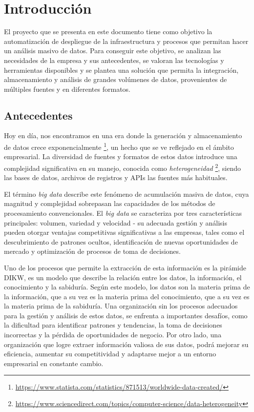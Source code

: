 \chapter{Introducción}\label{chap:intro}
El proyecto que se presenta en este documento tiene como objetivo la
automatización de despliegue de la infraestructura y procesos que permitan hacer
un análisis masivo de datos. Para conseguir este objetivo, se analizan las
necesidades de la empresa y sus antecedentes, se valoran las tecnologías y
herramientas disponibles y se plantea una solución que permita la integración,
almacenamiento y análisis de grandes volúmenes de datos, provenientes de
múltiples fuentes y en diferentes formatos.

\section{Antecedentes}\label{sec:antecedentes}
Hoy en día, nos encontramos en una era donde la generación y almacenamiento de
datos crece exponencialmente \footnote{
	\url{https://www.statista.com/statistics/871513/worldwide-data-created/}
}, un hecho que se ve reflejado en el ámbito empresarial. La diversidad de
fuentes y formatos de estos datos introduce una complejidad significativa en su
manejo, conocida como \textit{heterogeneidad} \footnote{
	\url{https://www.sciencedirect.com/topics/computer-science/data-heterogeneity}
}, siendo las bases de datos, archivos de registros y APIs las fuentes más
habituales.

El término \textit{big data} describe este fenómeno de acumulación masiva de
datos, cuya magnitud y complejidad sobrepasan las capacidades de los métodos de
procesamiento convencionales. El \textit{big data} se caracteriza por tres
características principales: volumen, variedad y velocidad - su adecuada gestión
y análisis pueden otorgar ventajas competitivas significativas a las empresas,
tales como el descubrimiento de patrones ocultos, identificación de nuevas
oportunidades de mercado y optimización de procesos de toma de decisiones.

Uno de los procesos que permite la extracción de esta información es la pirámide
DIKW, \cite{enwiki:1211227190} es un modelo que describe la relación entre los
datos, la información, el conocimiento y la sabiduría. Según este modelo, los
datos son la materia prima de la información, que a su vez es la materia prima
del conocimiento, que a su vez es la materia prima de la sabiduría. Una
organización sin los procesos adecuados para la gestión y análisis de estos
datos, se enfrenta a importantes desafíos, como la dificultad para identificar
patrones y tendencias, la toma de decisiones incorrectas y la pérdida de
oportunidades de negocio. Por otro lado, una organización que logre extraer
información valiosa de sus datos, podrá mejorar su eficiencia, aumentar su
competitividad y adaptarse mejor a un entorno empresarial en constante cambio.

